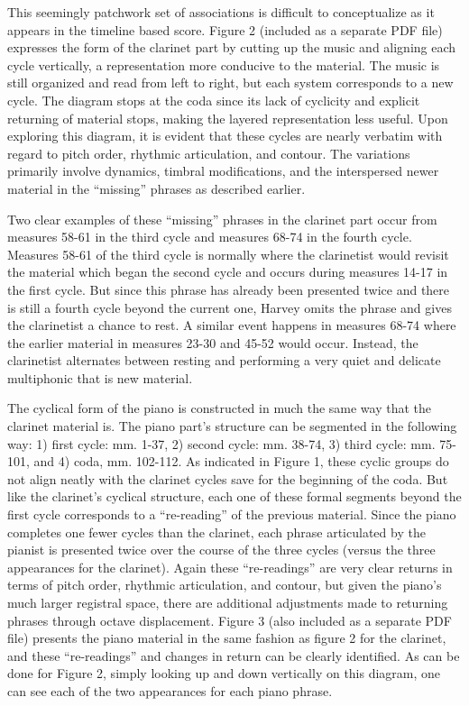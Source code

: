 This seemingly patchwork set of associations is difficult to conceptualize as it appears in the timeline based score. Figure 2 (included as a separate PDF file) expresses the form of the clarinet part by cutting up the music and aligning each cycle vertically, a representation more conducive to the material. The music is still organized and read from left to right, but each system corresponds to a new cycle. The diagram stops at the coda since its lack of cyclicity and explicit returning of material stops, making the layered representation less useful. Upon exploring this diagram, it is evident that these cycles are nearly verbatim with regard to pitch order, rhythmic articulation, and contour. The variations primarily involve dynamics, timbral modifications, and the interspersed newer material in the ``missing'' phrases as described earlier.

Two clear examples of these ``missing'' phrases in the clarinet part occur from measures 58-61 in the third cycle and measures 68-74 in the fourth cycle. Measures 58-61 of the third cycle is normally where the clarinetist would revisit the material which began the second cycle and occurs during measures 14-17 in the first cycle. But since this phrase has already been presented twice and there is still a fourth cycle beyond the current one, Harvey omits the phrase and gives the clarinetist a chance to rest. A similar event happens in measures 68-74 where the earlier material in measures 23-30 and 45-52 would occur. Instead, the clarinetist alternates between resting and performing a very quiet and delicate multiphonic that is new material.

The cyclical form of the piano is constructed in much the same way that the clarinet material is. The piano part's structure can be segmented in the following way: 1) first cycle: mm. 1-37, 2) second cycle: mm. 38-74, 3) third cycle: mm. 75-101, and 4) coda, mm. 102-112. As indicated in Figure 1, these cyclic groups do not align neatly with the clarinet cycles save for the beginning of the coda. But like the clarinet's cyclical structure, each one of these formal segments beyond the first cycle corresponds to a ``re-reading'' of the previous material. Since the piano completes one fewer cycles than the clarinet, each phrase articulated by the pianist is presented twice over the course of the three cycles (versus the three appearances for the clarinet). Again these ``re-readings'' are very clear returns in terms of pitch order, rhythmic articulation, and contour, but given the piano's much larger registral space, there are additional adjustments made to returning phrases through octave displacement. Figure 3 (also included as a separate PDF file) presents the piano material in the same fashion as figure 2 for the clarinet, and these ``re-readings'' and changes in return can be clearly identified. As can be done for Figure 2, simply looking up and down vertically on this diagram, one can see each of the two appearances for each piano phrase.

